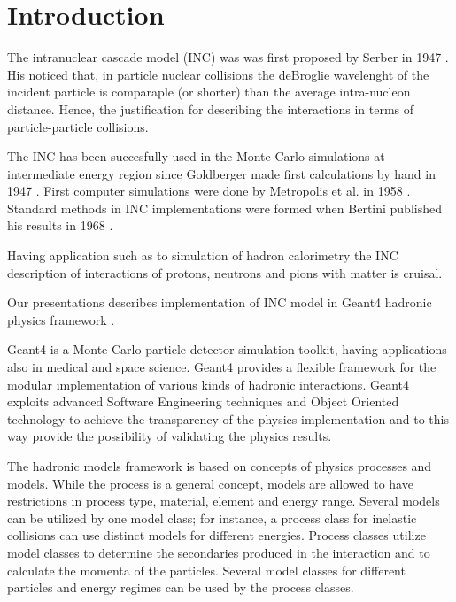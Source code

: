 \section{Introduction}

The intranuclear cascade model (INC) was was first proposed by Serber in 1947 \cite{serber47}.  
His noticed that, in particle nuclear collisions the deBroglie wavelenght of the incident particle is 
comparaple (or shorter) than the average intra-nucleon distance.
Hence, the justification for describing the interactions in terms of particle-particle  collisions.


The INC has been succesfully used in the Monte Carlo simulations at intermediate energy region 
since Goldberger made first calculations by hand in 1947 \cite{goldberger48}. 
First computer simulations were done by Metropolis et al. in 1958 \cite{metropolis58}. 
Standard methods in INC implementations were formed when Bertini published his results in 1968 \cite{bertini68}.


Having application such as to simulation of hadron calorimetry the INC description of interactions of protons, neutrons and pions with matter is cruisal.

Our presentations describes implementation of INC model in {\sc Geant4} hadronic physics framework \cite{geant4collaboration03}.


Geant4 is a Monte Carlo particle detector simulation toolkit, having applications also in  medical and space
science. 
Geant4 provides a flexible framework for the modular implementation of
various kinds of hadronic interactions. 
Geant4 exploits advanced Software Engineering techniques and Object
Oriented technology to achieve the transparency of the physics
implementation and to this way provide the possibility of validating the
physics results. 

The hadronic models framework is based on concepts of physics
processes and models. While the process is a general concept, models
are allowed to have restrictions in process type, material, element
and energy range.  Several models can be utilized by one model class; for instance, a
process class for inelastic collisions can use distinct models for different energies.
Process classes utilize model classes to determine the
secondaries produced in the interaction and to calculate the momenta
of the particles.  Several model classes for different particles and
energy regimes can be used by the process classes.





